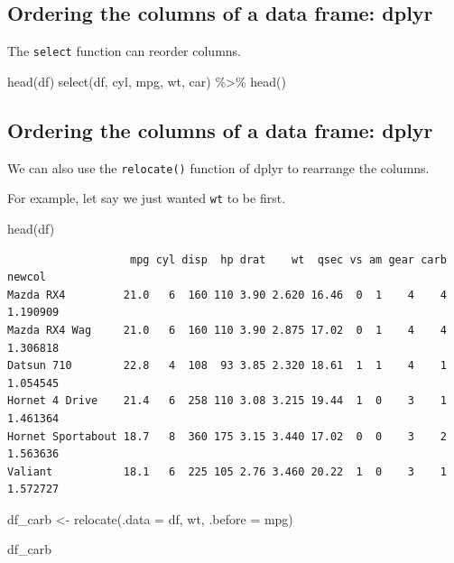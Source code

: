 \documentclass[
]{article}
\newenvironment{Shaded}{\begin{snugshade}}{\end{snugshade}}
\newcommand{\AttributeTok}[1]{\textcolor[rgb]{0.77,0.63,0.00}{#1}}
\newcommand{\FunctionTok}[1]{\textcolor[rgb]{0.00,0.00,0.00}{#1}}
\newcommand{\NormalTok}[1]{#1}
\newcommand{\OtherTok}[1]{\textcolor[rgb]{0.56,0.35,0.01}{#1}}
\newcommand{\SpecialCharTok}[1]{\textcolor[rgb]{0.00,0.00,0.00}{#1}}
\begin{document}
\hypertarget{ordering-the-columns-of-a-data-frame-dplyr}{%
\subsection{Ordering the columns of a data frame:
dplyr}\label{ordering-the-columns-of-a-data-frame-dplyr}}

The \texttt{select} function can reorder columns.

\begin{Shaded}
\begin{Highlighting}[]
\FunctionTok{head}\NormalTok{(df)}
\FunctionTok{select}\NormalTok{(df, cyl, mpg, wt, car) }\SpecialCharTok{\%\textgreater{}\%}
\FunctionTok{head}\NormalTok{()}
\end{Highlighting}
\end{Shaded}

\hypertarget{ordering-the-columns-of-a-data-frame-dplyr-1}{%
\subsection{Ordering the columns of a data frame:
dplyr}\label{ordering-the-columns-of-a-data-frame-dplyr-1}}

We can also use the \texttt{relocate()} function of dplyr to rearrange
the columns.

For example, let say we just wanted \texttt{wt} to be first.

\begin{Shaded}
\begin{Highlighting}[]
\FunctionTok{head}\NormalTok{(df)}
\end{Highlighting}
\end{Shaded}

\begin{verbatim}
                   mpg cyl disp  hp drat    wt  qsec vs am gear carb   newcol
Mazda RX4         21.0   6  160 110 3.90 2.620 16.46  0  1    4    4 1.190909
Mazda RX4 Wag     21.0   6  160 110 3.90 2.875 17.02  0  1    4    4 1.306818
Datsun 710        22.8   4  108  93 3.85 2.320 18.61  1  1    4    1 1.054545
Hornet 4 Drive    21.4   6  258 110 3.08 3.215 19.44  1  0    3    1 1.461364
Hornet Sportabout 18.7   8  360 175 3.15 3.440 17.02  0  0    3    2 1.563636
Valiant           18.1   6  225 105 2.76 3.460 20.22  1  0    3    1 1.572727
\end{verbatim}

\begin{Shaded}
\begin{Highlighting}[]
\NormalTok{df\_carb }\OtherTok{\textless{}{-}} \FunctionTok{relocate}\NormalTok{(}\AttributeTok{.data =}\NormalTok{ df, wt,}
                       \AttributeTok{.before =}\NormalTok{ mpg)}

\NormalTok{df\_carb}
\end{Highlighting}
\end{Shaded}
\end{document}
